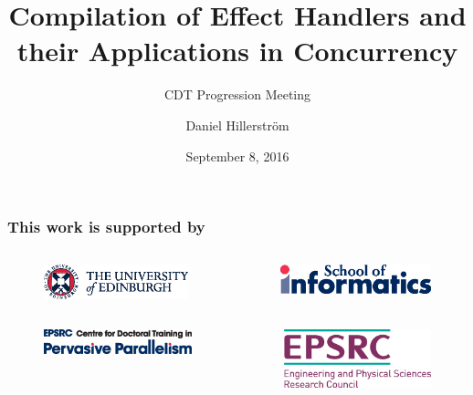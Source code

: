\documentclass[10pt,compress]{beamer}
\author[D. Hillerström]{Daniel Hillerström}
\title{Compilation of Effect Handlers and their Applications in Concurrency}
\institute[University of Edinburgh]{CDT Pervasive Parallelism}
\subtitle{CDT Progression Meeting}
\date[08-09-2016]{September 8, 2016}
\begin{document}
\begin{frame}[plain]
\frametitle{This work is supported by}
\begin{columns}[T]
\begin{column}{0.5\textwidth}
\begin{figure}
\includegraphics[scale=0.6]{figures/uoe.eps}
\end{figure}
\end{column}
\hfill
\begin{column}{0.5\textwidth}
\begin{figure}
\includegraphics[scale=0.6]{figures/school_of_informatics.eps}
\end{figure}
\end{column}
\end{columns}

\vfill

\begin{columns}[T]
\begin{column}{0.5\textwidth}
\begin{figure}
\includegraphics[scale=0.35]{figures/cdtppar.eps}
\end{figure}
\end{column}
\hfill
\begin{column}{0.5\textwidth}
\begin{figure}
\includegraphics[scale=0.3]{figures/epsrc.eps}
\end{figure}
\end{column}
\end{columns}


\end{frame}
\end{document}
